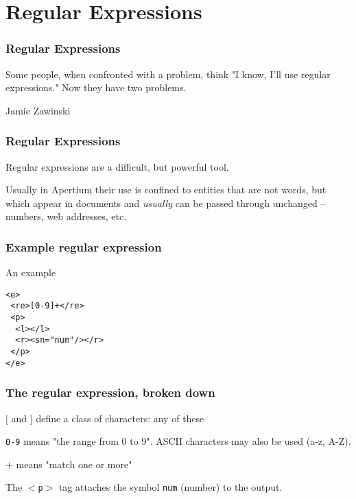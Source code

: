 \documentclass{beamer} %
\begin{document}
\section{Regular Expressions}
\begin{frame}
  \frametitle{Regular Expressions}
  \epigraph{Some people, when confronted with a problem, think "I know, I'll use regular expressions." Now they have two problems.}{Jamie Zawinski}
\end{frame}
\begin{frame}
  \frametitle{Regular Expressions}
  Regular expressions are a difficult, but powerful tool.

  Usually in Apertium their use is confined to entities that are not words, but which appear in documents and {\it usually}
  can be passed through unchanged -- numbers, web addresses, etc.
\end{frame}
\begin{frame}
  \frametitle{Example regular expression}

  \begin{exampleblock}{An example}
    \begin{footnotesize}
    \begin{alltt}
      <e> \\
      ~<re>[0-9]+</re> \\
      ~<p> \\
      ~~<l></l> \\
      ~~<r><s n="num"/></r> \\
      ~</p> \\
      </e> \\
    \end{alltt}
    \end{footnotesize}
  \end{exampleblock}
\end{frame}
\begin{frame}
  \frametitle{The regular expression, broken down}

  {\tt $[$} and {\tt $]$} define a class of characters: any of these

  {\tt 0-9} means "the range from 0 to 9". ASCII characters may also be used (a-z, A-Z).

  {\tt $+$} means "match one or more"
  
  The {\tt $<$p$>$} tag attaches the symbol {\tt num} (number) to 
  the output.
\end{frame}
\end{document}
